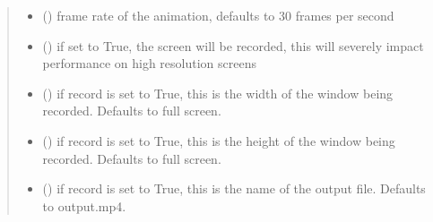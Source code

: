 \documentclass[letterpaper,10pt,english]{sphinxmanual}
\begin{document}
\begin{fulllineitems}
\begin{fulllineitems}
\begin{quote}
\begin{description}
\begin{itemize}
\item {} 
\sphinxAtStartPar
{} () \textendash{} frame rate of the animation, defaults to 30 frames per second

\item {} 
\sphinxAtStartPar
{} () \textendash{} if set to True, the screen will be recorded, this will severely impact performance on high resolution screens

\item {} 
\sphinxAtStartPar
{} () \textendash{} if record is set to True, this is the width of the window being recorded. Defaults to full screen.

\item {} 
\sphinxAtStartPar
{} () \textendash{} if record is set to True, this is the height of the window being recorded. Defaults to full screen.

\item {} 
\sphinxAtStartPar
{} () \textendash{} if record is set to True, this is the name of the output file. Defaults to output.mp4.

\end{itemize}

\end{description}\end{quote}

\end{fulllineitems}


\begin{fulllineitems}
\label{\detokenize{index:sjvisualizer.Canvas.canvas.set_decimals}}
\pysigstartsignatures
{}
\pysigstopsignatures
\end{fulllineitems}



\end{fulllineitems}
\end{document}
